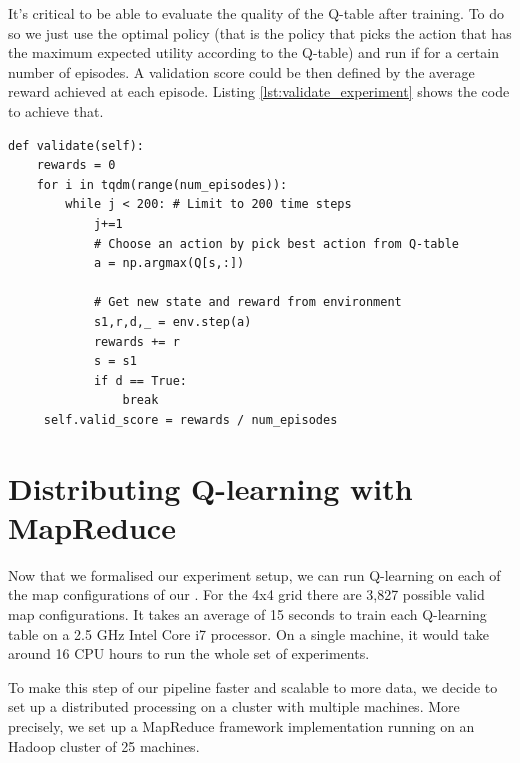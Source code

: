 It's critical to be able to evaluate the quality of the Q-table after training. To do so we just use the optimal policy (that is the policy that picks the action that has the maximum expected utility according to the Q-table) and run if for a certain number of episodes. A validation score could be then defined by the average reward achieved at each episode. Listing \ref{lst:validate_experiment} shows the code to achieve that.

\begin{minipage}{\linewidth}
\lstset{language=Python}
\lstset{frame=lines}
\lstset{basicstyle=\footnotesize}
\begin{lstlisting}
def validate(self):
	rewards = 0
    for i in tqdm(range(num_episodes)):
        while j < 200: # Limit to 200 time steps
            j+=1
            # Choose an action by pick best action from Q-table
            a = np.argmax(Q[s,:])
            
            # Get new state and reward from environment
            s1,r,d,_ = env.step(a)
            rewards += r
            s = s1
            if d == True:
                break
     self.valid_score = rewards / num_episodes
\end{lstlisting}
\end{minipage}


\section{Distributing Q-learning with MapReduce}
Now that we formalised our experiment setup, we can run Q-learning on each of the map configurations of our . For the 4x4 grid there are 3,827 possible valid map configurations. It takes an average of 15 seconds to train each Q-learning table on a 2.5 GHz Intel Core i7 processor. On a single machine, it would take around 16 CPU hours to run the whole set of experiments.

To make this step of our pipeline faster and scalable to more data, we decide to set up a distributed processing on a cluster with multiple machines. More precisely, we set up a MapReduce framework \parencite{Dean:2004:MSD:1251254.1251264} implementation running on an Hadoop cluster \parencite{shvachko2010hadoop} of 25 machines.

